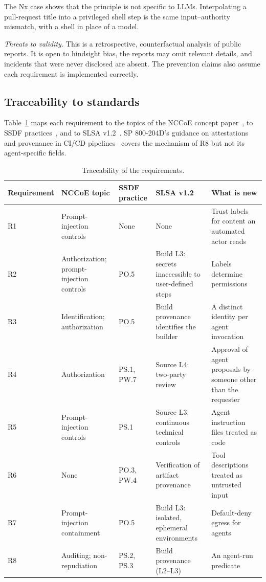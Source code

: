 \documentclass[acmsmall,screen,review]{acmart}
\begin{document}
The Nx case shows that the principle is not specific to LLMs. Interpolating a pull-request title into a privileged shell step is the same input–authority mismatch, with a shell in place of a model.

\emph{Threats to validity.} This is a retrospective, counterfactual analysis of public reports. It is open to hindsight bias, the reports may omit relevant details, and incidents that were never disclosed are absent. The prevention claims also assume each requirement is implemented correctly.


\subsection{Traceability to standards}\label{sec:8.2}

Table~\ref{tab:5} maps each requirement to the topics of the NCCoE concept paper~\cite{booth2026accelerating}, to SSDF practices~\cite{souppaya2022secure,booth2025secure}, and to SLSA v1.2~\cite{openndslsa}. SP 800-204D's guidance on attestations and provenance in CI/CD pipelines~\cite{chandramouli2024strategies} covers the mechanism of R8 but not its agent-specific fields.

\begin{table}[htbp]
\caption{Traceability of the requirements.}
\label{tab:5}
\footnotesize
\begin{tabularx}{\linewidth}{@{}>{\hsize=0.924\hsize\raggedright\arraybackslash}X>{\hsize=1.119\hsize\raggedright\arraybackslash}X>{\hsize=0.681\hsize\raggedright\arraybackslash}X>{\hsize=1.036\hsize\raggedright\arraybackslash}X>{\hsize=1.240\hsize\raggedright\arraybackslash}X@{}}
\toprule
\textbf{Requirement} & \textbf{NCCoE topic} & \textbf{SSDF practice} & \textbf{SLSA v1.2} & \textbf{What is new} \\
\midrule
R1 & Prompt-injection controls & None & None & Trust labels for content an automated actor reads \\
R2 & Authorization; prompt-injection controls & PO.5 & Build L3: secrets inaccessible to user-defined steps & Labels determine permissions \\
R3 & Identification; authorization & PO.5 & Build provenance identifies the builder & A distinct identity per agent invocation \\
R4 & Authorization & PS.1, PW.7 & Source L4: two-party review & Approval of agent proposals by someone other than the requester \\
R5 & Prompt-injection controls & PS.1 & Source L3: continuous technical controls & Agent instruction files treated as code \\
R6 & None & PO.3, PW.4 & Verification of artifact provenance & Tool descriptions treated as untrusted input \\
R7 & Prompt-injection containment & PO.5 & Build L3: isolated, ephemeral environments & Default-deny egress for agents \\
R8 & Auditing; non-repudiation & PS.2, PS.3 & Build provenance (L2–L3) & An agent-run predicate \\
\bottomrule
\end{tabularx}
\end{table}
\end{document}
